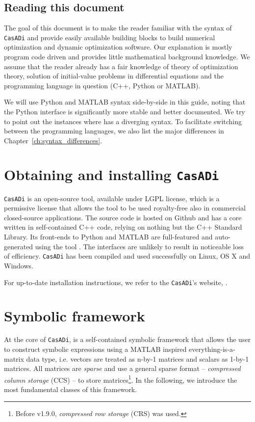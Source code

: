 \documentclass[a4paper,12pt]{book}
\newcommand{\CasADi}{\texttt{CasADi}\xspace}
\begin{document}
\section{Reading this document}
The goal of this document is to make the reader familiar with the syntax of \CasADi and provide easily available building blocks to build numerical optimization and dynamic optimization software. Our explanation is mostly program code driven and provides little mathematical background knowledge. We assume that the reader already has a fair knowledge of theory of optimization theory, solution of initial-value problems in differential equations and the programming language in question (C++, Python or MATLAB).

We will use Python and MATLAB syntax side-by-side in this guide, noting that the Python interface is significantly more stable and better documented. We try to point out the instances where has a diverging syntax. To facilitate switching between the programming languages, we also list the major differences in Chapter~\ref{ch:syntax_differences}.

\chapter{Obtaining and installing \CasADi}
\CasADi is an open-source tool, available under LGPL license, which is a permissive license that allows the tool to be used royalty-free also in commercial closed-source applications. The source code is hosted on Github and has a core written in self-contained C++ code, relying on nothing but the C++ Standard Library. Its front-ends to Python and MATLAB are full-featured and auto-generated using the tool . The interfaces are unlikely to result in noticeable loss of efficiency. \CasADi has been compiled and used successfully on Linux, OS X and Windows.

For up-to-date installation instructions, we refer to the \CasADi's website, .

\chapter{Symbolic framework}
At the core of \CasADi, is a self-contained symbolic framework that allows the user to construct symbolic expressions using a MATLAB inspired everything-is-a-matrix data type, i.e. vectors are treated as n-by-1 matrices and scalars as 1-by-1 matrices. All matrices are \emph{sparse} and use a general sparse format -- \emph{compressed column storage} (CCS) -- to store matrices\footnote{Before v1.9.0, \emph{compressed row storage} (CRS) was used.}. In the following, we introduce the most fundamental classes of this framework.
\end{document}
